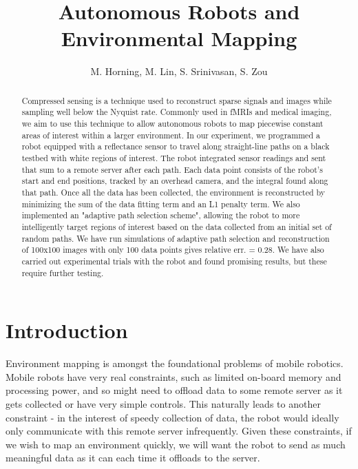 \documentclass[english]{article}\usepackage[]{graphicx}\usepackage[]{color}
\begin{document}
\title{Autonomous Robots and Environmental Mapping}

\author{M. Horning, M. Lin, S. Srinivasan, S. Zou}

\maketitle

\begin{abstract}

Compressed sensing is a technique used to reconstruct sparse signals and images while sampling well below the Nyquist rate. Commonly used in fMRIs and medical imaging, we aim to use this technique to allow autonomous robots to map piecewise constant areas of interest within a larger environment. In our experiment, we programmed a robot equipped with a reflectance sensor to travel along straight-line paths on a black testbed with white regions of interest. The robot integrated sensor readings and sent that sum to a remote server after each path. Each data point consists of the robot's start and end positions, tracked by an overhead camera, and the integral found along that path. Once all the data has been collected, the environment is reconstructed by minimizing the sum of the data fitting term and an L1 penalty term. We also implemented an "adaptive path selection scheme", allowing the robot to more intelligently target regions of interest based on the data collected from an initial set of random paths. We have run simulations of adaptive path selection and reconstruction of 100x100 images with only 100 data points gives relative err. = 0.28. We have also carried out experimental trials with the robot and found promising results, but these require further testing.

\end{abstract}

\pagebreak
\tableofcontents
\pagebreak

\section{Introduction}

Environment mapping is amongst the foundational problems of mobile robotics. Mobile robots have very real constraints, such as limited on-board memory and processing power, and so might need to offload data to some remote server as it gets collected or have very simple controls. This naturally leads to another constraint - in the interest of speedy collection of data, the robot would ideally only communicate with this remote server infrequently. Given these constraints, if we wish to map an environment quickly, we will want the robot to send as much meaningful data as it can each time it offloads to the server.
\end{document}
